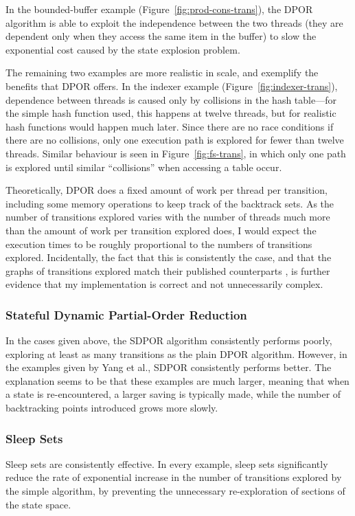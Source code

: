 \documentclass[12pt,a4paper,twoside,openright]{report}
\begin{document}
In the bounded-buffer example
(Figure~\ref{fig:prod-cons-trans}),
the DPOR algorithm is able to exploit
the independence between the two threads
(they are dependent only when they
access the same item in the buffer) to
slow the
exponential cost caused by the
state explosion problem.

The remaining two examples are more
realistic in scale, and exemplify the
benefits that DPOR offers.
In the indexer example
(Figure~\ref{fig:indexer-trans}),
dependence between
threads is caused only by collisions
in the hash table---for the simple
hash function used, this happens at twelve threads,
but for realistic hash functions would
happen much later. Since there are no
race conditions if there are no collisions,
only one execution path
is explored for fewer than twelve threads.
Similar behaviour is seen in
Figure~\ref{fig:fs-trans}, in which only
one path is explored until similar ``collisions''
when accessing a table occur.

Theoretically, DPOR does a fixed amount of
work per thread per transition, including some
memory operations to keep track of the backtrack
sets. As the number of transitions explored
varies with
the number of threads much more than the amount
of work per transition explored does, I would
expect the execution times to be roughly
proportional to the numbers of transitions
explored. Incidentally, the fact that this is consistently
the case, and that the graphs of transitions
explored match their published counterparts
\cite{flan05},
is further evidence that my
implementation is correct and not
unnecessarily complex.

\subsubsection{Stateful Dynamic Partial-Order Reduction}
In the cases given above, the SDPOR algorithm
consistently performs poorly, exploring at
least as many transitions as the plain
DPOR algorithm. However, in the examples
given by Yang et al.\@ \cite{yang08},
SDPOR consistently performs better.
The explanation seems to be that
these examples are much larger, meaning
that when a state is re-encountered,
a larger saving is typically made,
while the number of backtracking
points introduced grows more slowly.

\subsubsection{Sleep Sets}
Sleep sets are consistently effective.
In every example,
sleep sets significantly reduce the
rate of exponential increase in
the number of transitions explored by the
simple algorithm, by preventing the
unnecessary re-exploration of sections
of the state space.
\end{document}
